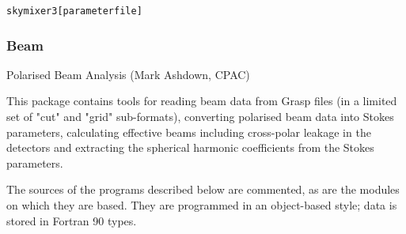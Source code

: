 \begin{alltt}
skymixer3 [parameter file]


\end{alltt}

\subsubsection {Beam}

Polarised Beam Analysis (Mark Ashdown, CPAC)

This package contains tools for reading beam data from Grasp files (in
a limited set of "cut" and "grid" sub-formats), converting polarised
beam data into Stokes parameters, calculating effective beams
including cross-polar leakage in the detectors and extracting the
spherical harmonic coefficients from the Stokes parameters.

The sources of the programs described below are commented, as are the
modules on which they are based. They are programmed in an
object-based style; data is stored in Fortran 90 types.

